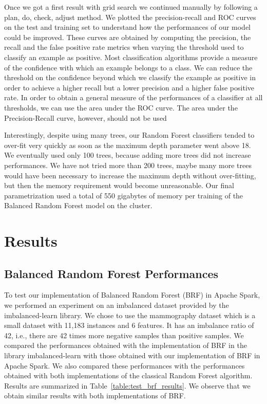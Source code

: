 \documentclass[conference]{IEEEtran}
\begin{document}
Once we got a first result with grid search we continued manually by
following a plan, do, check, adjust method. We plotted the precision-recall and ROC curves on the test and training set to understand how the performances of our model could be improved. These curves are obtained by computing the precision, the recall and the false positive rate metrics when varying the threshold used to classify an example as positive. Most classification algorithms provide a measure of the confidence with which an example belongs to a class. We can reduce the threshold on the confidence beyond which we classify the example as positive in order to achieve a higher recall but a lower precision and a higher false positive rate.
In order to obtain a general measure of the performances of a classifier
at all thresholds, we can use the area under the ROC curve. The area under the Precision-Recall curve, however, should not be used\cite{flach2015precision}


Interestingly, despite using many trees, our Random Forest classifiers
tended to over-fit very quickly as soon as the maximum depth parameter went
above 18. We eventually used only 100 trees, because adding more trees did
not increase performances. We have not tried more than 200 trees, maybe
many more trees would have been necessary to increase the maximum depth
without over-fitting, but then the memory requirement would become unreasonable.
Our final parametrization used a total of 550 gigabytes of memory per training of the Balanced Random Forest model on the cluster.


\section{Results}
\label{sec:results}


\subsection{Balanced Random Forest Performances}

To test our implementation of Balanced Random Forest (BRF) in Apache Spark, we performed an experiment on an imbalanced dataset provided by the imbalanced-learn library.
We chose to use the mammography dataset\cite{Woods1993} which is a small dataset with 11,183 instances and 6 features. It has an imbalance ratio of 42, i.e., there are 42 times more negative samples than positive samples. We compared the performances obtained with the implementation of BRF in the library imbalanced-learn with those obtained with our implementation of BRF in Apache Spark. We also compared these performances with the performances obtained with both implementations of the classical Random Forest algorithm.
Results are summarized in Table~\ref{table:test_brf_results}. We observe that we obtain similar results with both implementations of BRF.
\end{document}
